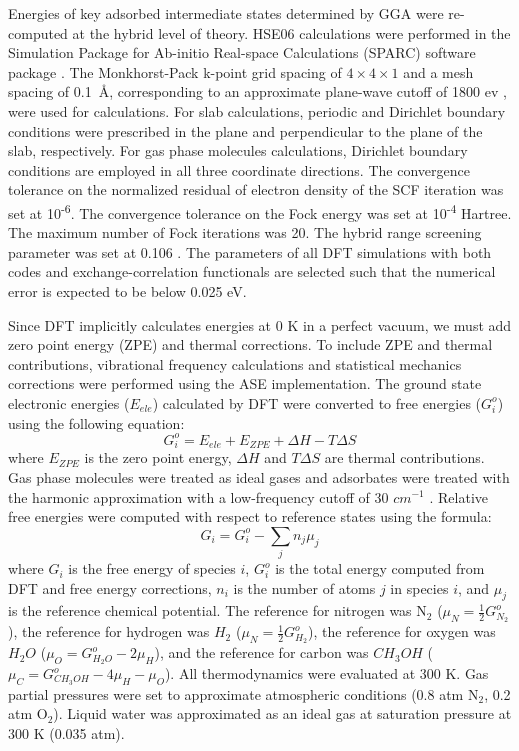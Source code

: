 Energies of key adsorbed intermediate states determined by GGA were re-computed at the hybrid level of theory. HSE06 calculations were performed in the Simulation Package for Ab-initio Real-space Calculations (SPARC) software package \cite{SPARC}. The Monkhorst-Pack k-point grid spacing of {$4\times4\times 1$} and a mesh spacing of 0.1\textup{~\AA}, corresponding to an approximate plane-wave cutoff of 1800 ev \cite{Ecut_conversion, Abinit}, were used for calculations. For slab calculations, periodic and Dirichlet boundary conditions were prescribed in the plane and perpendicular to the plane of the slab, respectively. For gas phase molecules calculations, Dirichlet boundary conditions are employed in all three coordinate directions. The convergence tolerance on the normalized residual of electron density of the SCF iteration was set at 10\textsuperscript{-6}. The convergence tolerance on the Fock energy was set at 10\textsuperscript{-4} Hartree. The maximum number of Fock iterations was 20. The hybrid range screening parameter was set at 0.106 \cite{hse}. The parameters of all DFT simulations with both codes and exchange-correlation functionals are selected such that the numerical error is expected to be below 0.025 eV.

Since DFT implicitly calculates energies at 0 K in a perfect vacuum, we must add zero point energy (ZPE) and thermal corrections. To include ZPE and thermal contributions, vibrational frequency calculations and statistical mechanics corrections were performed using the ASE implementation. The ground state electronic energies ($E_{ele}$) calculated by DFT were converted to free energies ($G_i^o$) using the following equation:
\begin{equation}
G_i^o =E_{ele} + E_{ZPE} + \Delta H - T \Delta S
\end{equation}
where $E_{ZPE}$ is the zero point energy, $\Delta H $ and $T \Delta S$ are thermal contributions. Gas phase molecules were treated as ideal gases and adsorbates were treated with the harmonic approximation with a low-frequency cutoff of 30 $cm^{-1}$ \cite{BROGAARD_2014}.
Relative free energies were computed with respect to reference states using the formula:
\begin{equation}
G_i = G_i^o - \sum_j n_j \mu_j
\end{equation}
where  $G_i$ is the free energy of species $i$, $G_i^o $ is the total energy computed from DFT and free energy corrections, $n_i$ is the number of atoms $j$ in species $i$, and $\mu_j$ is the reference chemical potential. The reference for nitrogen was N$_2$ ($\mu_N = \frac{1}{2}G_{N_2}^o$), the reference for hydrogen was $H_2$ ($\mu_N = \frac{1}{2}G_{H_2}^o$), the reference for oxygen was $H_2O$ ($\mu_O = G_{H_2O}^o - 2\mu_H$), and the reference for carbon was $CH_3OH$ ($\mu_C = G_{CH_3OH}^o - 4\mu_H - \mu_O$). All thermodynamics were evaluated at 300 K. Gas partial pressures were set to approximate atmospheric conditions (0.8 atm N$_2$, 0.2 atm O$_2$). Liquid water was approximated as an ideal gas at saturation pressure at 300 K (0.035 atm).

